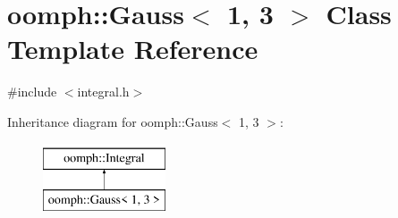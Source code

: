 \hypertarget{classoomph_1_1Gauss_3_011_00_013_01_4}{}\section{oomph\+:\+:Gauss$<$ 1, 3 $>$ Class Template Reference}
\label{classoomph_1_1Gauss_3_011_00_013_01_4}


{\ttfamily \#include $<$integral.\+h$>$}

Inheritance diagram for oomph\+:\+:Gauss$<$ 1, 3 $>$\+:\begin{figure}[H]
\begin{center}
\leavevmode
\includegraphics[height=2.000000cm]{classoomph_1_1Gauss_3_011_00_013_01_4}
\end{center}
\end{figure}
